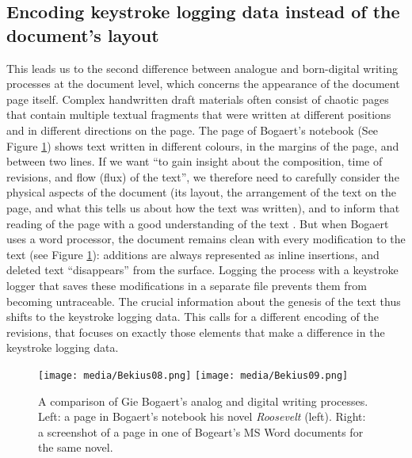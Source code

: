 \begin{paper}
\subsection{Encoding keystroke logging data instead of the
document's
layout}

This leads us to the second difference between analogue and born-digital
writing processes at the document level, which concerns the appearance
of the document page itself. Complex handwritten draft materials often
consist of chaotic pages that contain multiple textual fragments that
were written at different positions and in different directions on the
page. The page of Bogaert's notebook (See Figure \ref{fig:bekius:notebook}) shows text written in
different colours, in the margins of the page, and between two lines. If we want ``to gain insight about
the composition, time of revisions, and flow (flux) of the text'', we therefore need to carefully consider the physical aspects of the document (its layout, the arrangement of the text on the page, and what this tells us about how the text was written), and to inform that reading of the page with a good understanding of the text \citep[§1.3]{workgroup_on_genetic_editions_encoding_2010}. But when Bogaert uses a word
processor, the document remains clean with every modification to the text
(see Figure \ref{fig:bekius:notebook}): additions are always represented as inline insertions, and
deleted text ``disappears'' from the surface. Logging the process with a
keystroke logger that saves these modifications in a separate file prevents them from becoming untraceable. The crucial information about the
genesis of the text thus shifts to the keystroke logging data. This
calls for a different encoding of the revisions, that focuses on exactly those elements that make a difference in the keystroke logging data.

\begin{figure}[!ht]
    \centering
    \texttt{[image: media/Bekius08.png]}
    \texttt{[image: media/Bekius09.png]}    
    \caption{A comparison of Gie Bogaert's analog and digital writing processes. Left: a page in Bogaert's notebook his novel \emph{Roosevelt} (left). Right: a screenshot of a page in one of Bogeart's MS Word documents for the same novel.}
    \label{fig:bekius:notebook}
\end{figure}


\end{paper}
